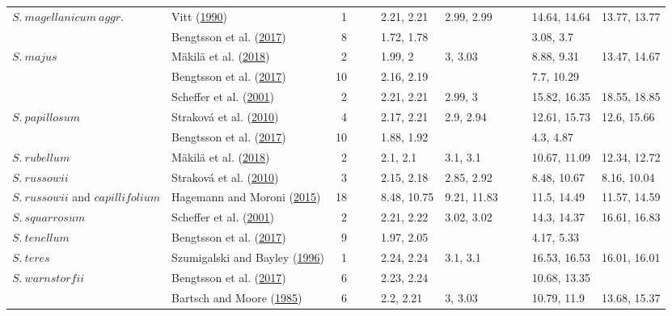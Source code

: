 \documentclass[
  12pt,
]{article}
\begin{document}
\begin{table}[H]
{\begin{tabular}[t]{llrllllllll}
\multirow[t]{-4}{*}{\raggedright\arraybackslash $S.~magellanicum~aggr.$} & Vitt (\protect\hyperlink{ref-Vitt.1990}{1990}) & 1 &  &  & 2.21, 2.21 & 2.99, 2.99 &  &  & 14.64, 14.64 & 13.77, 13.77\\
\cmidrule{1-11}
 & Bengtsson et al. (\protect\hyperlink{ref-Bengtsson.2017}{2017}) & 8 &  &  & 1.72, 1.78 &  &  &  & 3.08, 3.7 & \\

\multirow[t]{-2}{*}{\raggedright\arraybackslash $S.~majus$} & Mäkilä et al. (\protect\hyperlink{ref-Makila.2018}{2018}) & 2 &  &  & 1.99, 2 & 3, 3.03 &  &  & 8.88, 9.31 & 13.47, 14.67\\
\cmidrule{1-11}
 & Bengtsson et al. (\protect\hyperlink{ref-Bengtsson.2017}{2017}) & 10 &  &  & 2.16, 2.19 &  &  &  & 7.7, 10.29 & \\

 & Scheffer et al. (\protect\hyperlink{ref-Scheffer.2001}{2001}) & 2 &  &  & 2.21, 2.21 & 2.99, 3 &  &  & 15.82, 16.35 & 18.55, 18.85\\

\multirow[t]{-3}{*}{\raggedright\arraybackslash $S.~papillosum$} & Straková et al. (\protect\hyperlink{ref-Strakova.2010}{2010}) & 4 &  &  & 2.17, 2.21 & 2.9, 2.94 &  &  & 12.61, 15.73 & 12.6, 15.66\\
\cmidrule{1-11}
 & Bengtsson et al. (\protect\hyperlink{ref-Bengtsson.2017}{2017}) & 10 &  &  & 1.88, 1.92 &  &  &  & 4.3, 4.87 & \\

\multirow[t]{-2}{*}{\raggedright\arraybackslash $S.~rubellum$} & Mäkilä et al. (\protect\hyperlink{ref-Makila.2018}{2018}) & 2 &  &  & 2.1, 2.1 & 3.1, 3.1 &  &  & 10.67, 11.09 & 12.34, 12.72\\
\cmidrule{1-11}
$S.~russowii$ & Straková et al. (\protect\hyperlink{ref-Strakova.2010}{2010}) & 3 &  &  & 2.15, 2.18 & 2.85, 2.92 &  &  & 8.48, 10.67 & 8.16, 10.04\\
\cmidrule{1-11}
$S.~russowii$ and $capillifolium$ & Hagemann and Moroni (\protect\hyperlink{ref-Hagemann.2015}{2015}) & 18 &  &  & 8.48, 10.75 & 9.21, 11.83 &  &  & 11.5, 14.49 & 11.57, 14.59\\
\cmidrule{1-11}
$S.~squarrosum$ & Scheffer et al. (\protect\hyperlink{ref-Scheffer.2001}{2001}) & 2 &  &  & 2.21, 2.22 & 3.02, 3.02 &  &  & 14.3, 14.37 & 16.61, 16.83\\
\cmidrule{1-11}
$S.~tenellum$ & Bengtsson et al. (\protect\hyperlink{ref-Bengtsson.2017}{2017}) & 9 &  &  & 1.97, 2.05 &  &  &  & 4.17, 5.33 & \\
\cmidrule{1-11}
$S.~teres$ & Szumigalski and Bayley (\protect\hyperlink{ref-Szumigalski.1996}{1996}) & 1 &  &  & 2.24, 2.24 & 3.1, 3.1 &  &  & 16.53, 16.53 & 16.01, 16.01\\
\cmidrule{1-11}
$S.~warnstorfii$ & Bengtsson et al. (\protect\hyperlink{ref-Bengtsson.2017}{2017}) & 6 &  &  & 2.23, 2.24 &  &  &  & 10.68, 13.35 & \\
\cmidrule{1-11}
 & Bartsch and Moore (\protect\hyperlink{ref-Bartsch.1985}{1985}) & 6 &  &  & 2.2, 2.21 & 3, 3.03 &  &  & 10.79, 11.9 & 13.68, 15.37\\


\end{tabular}}
\end{table}
\end{document}
